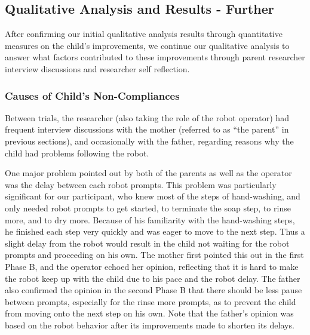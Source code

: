 \subsection{Qualitative Analysis and Results - Further}
After confirming our initial qualitative analysis results through quantitative measures on the child's improvements, we continue our qualitative analysis to answer what factors contributed to these improvements through parent researcher interview discussions and researcher self reflection.

\subsubsection{Causes of Child's Non-Compliances}
Between trials, the researcher (also taking the role of the robot operator) had frequent interview discussions with the mother (referred to as ``the parent'' in previous sections), and occasionally with the father, regarding reasons why the child had problems following the robot.

One major problem pointed out by both of the parents as well as the operator was the delay between each robot prompts.  This problem was particularly significant for our participant, who knew most of the steps of hand-washing, and only needed robot prompts to get started, to terminate the soap step, to rinse more, and to dry more.  Because of his familiarity with the hand-washing steps, he finished each step very quickly and was eager to move to the next step.  Thus a slight delay from the robot would result in the child not waiting for the robot prompts and proceeding on his own.  The mother first pointed this out in the first Phase B, and the operator echoed her opinion, reflecting that it is hard to make the robot keep up with the child due to his pace and the robot delay.  The father also confirmed the opinion in the second Phase B that there should be less pause between prompts, especially for the rinse more prompts, as to prevent the child from moving onto the next step on his own.  Note that the father's opinion was based on the robot behavior after its improvements made to shorten its delays.

